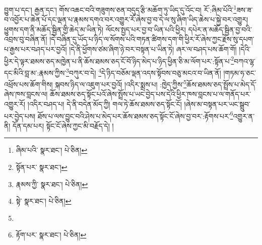 བྱུག་པ་དང་། རྒྱན་དང་། གོས་འཆང་བའི་གཟུགས་ཅན་བདུད་རྩི་མཆོག་ཏུ་ཡིད་དུ་འོང་བ། རོ་:ཞིམ་པོའི་\footnote{ཞིམ་པའི་  སྣར་ཐང་།  པེ་ཅིན། }ཟས་ཟ་བ་འབྱོར་པ་ཆེན་པོ་དང་ལྡན་པ་རྣམས་དགའ་བར་འགྱུར་རོ་ཞེས་བྱ་བ་དེ་ལ་སུ་ཞིག་ཡིད་ཆེས་པ་སྐྱེ་བར་འགྱུར། ཕྱུགས་དག་ནི་མཆོད་སྦྱིན་གྱི་ཆེད་མ་ཡིན་ཏེ། ལོངས་སྤྱད་པར་བྱ་བ་ཡིན་པའི་ཕྱིར། དཔེར་ན་མཆོད་སྦྱིན་བྱ་བའི་འབྲས་བུ་བཞིན་ནོ། །དེ་བཞིན་དུ་ཡོད་པ་ཉིད་ལ་སོགས་པའི་གཏན་ཚིགས་དག་གི་ཕྱིར་རོ་ཞེས་ཀྱང་རྗེས་སུ་དཔག་པ་རྒྱས་པར་བཤད་པར་བྱའོ། །དེ་ནི་ཕྱོགས་ཙམ་ཞིག་ཉེ་བར་བསྟན་པ་ཡིན་ཏེ། ཞར་ལ་བཤད་པས་ཆོག་གོ། །དེའི་ཕྱིར་དེ་ལྟར་ཐམས་ཅད་མཁྱེན་པ་ནི་ཆོས་ཐམས་ཅད་ངོ་བོ་ཉིད་མེད་པ་ཉིད་ཕྱིན་ཅི་མ་ལོག་པར་:སྟོན་པ་\footnote{སྟོན་པར་  སྣར་ཐང་། }བཀའ་ལྷ་དང་མིའི་བླ་མ་:རྣམས་ཀྱིས་\footnote{རྣམས་ཀྱི་  སྣར་ཐང་།  པེ་ཅིན། }བཀུར་བ་དེ། \footnote{སྟེ་  སྣར་ཐང་།  པེ་ཅིན། }དེ་ཉིད་བཅོམ་ལྡན་འདས་སྟོབས་བཅུ་མངའ་བ་ཡིན་ནོ། །གཏམ་ཧ་ཅང་འཕྲོས་པས་ཆོག་གིས། སྐབས་ཉིད་ལ་འཇུག་པར་བྱའོ། །འདིར་སྨྲས་པ། :ཁྱེད་ཀྱིས་\footnote{}ཆོས་ཐམས་ཅད་སྤྲོས་པ་མེད་དོ་ཞེས་ཁས་བླངས་ལ། ཆོས་ཐམས་ཅད་སྟོང་པའོ་ཞེས་སྤྲོས་པ་ཡང་བྱེད་པས་དེའི་ཕྱིར་ཁས་བླངས་པ་ལ་གནོད་པར་འགྱུར་རོ། །འདིར་བཤད་པ། དེ་ནི་བདེན་མོད་ཀྱི། གལ་ཏེ་ཆོས་ཐམས་ཅད་སྟོང་ངོ། །ཞེས་མ་བསྟན་པར་ཡང་སྒྲུབ་པར་བྱེད་པས། ཐོས་པ་ལས་བྱུང་བའི་ཤེས་པ་མེད་པར་ཆོས་ཐམས་ཅད་སྟོང་ངོ་ཞེས་བྱ་བར་:རྟོགས་པར་\footnote{རྟོག་པར་  སྣར་ཐང་།  པེ་ཅིན། }འགྱུར་ན་ནི། དོན་དམ་པར། སྟོང་ངོ་ཞེས་ཀྱང་མི་བརྗོད་དེ། །
